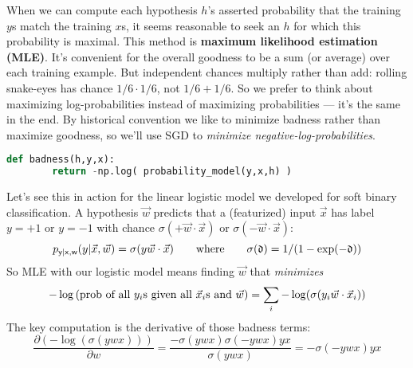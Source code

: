   When we can compute each hypothesis $h$'s asserted probability
  that the training $y$s match the training $x$s, it seems
  reasonable to seek an $h$ for which this probability is maximal.  This
  method is \textbf{maximum likelihood estimation (MLE)}.
  It's convenient for the overall goodness to be a sum (or average) over each
  training example.  But independent chances multiply rather than add:
  rolling snake-eyes has chance $1\!/\!6 \cdot 1\!/\!6$, not $1\!/\!6 + 1\!/\!6$.  So
  we prefer to think about maximizing log-probabilities instead of maximizing
  probabilities --- it's the same in the end.
  By historical
  convention we like to minimize badness rather than maximize goodness, so
  we'll use SGD to \emph{minimize negative-log-probabilities}.
  \begin{lstlisting}[language=Python, basicstyle=\footnotesize\ttfamily]
    def badness(h,y,x):
        return -np.log( probability_model(y,x,h) )
  \end{lstlisting}

  Let's see this in action for the linear logistic model we developed for soft
  binary classification.  A hypothesis $\vec w$ predicts that a (featurized)
  input $\vec x$ has label $y=+1$ or $y=-1$ with chance $\sigma(+ \vec w \cdot \vec x)$
  or $\sigma(- \vec w \cdot \vec x)$:
  $$
    p_{\mathsf{y}|\mathsf{x},\mathsf{w}}(y|\vec x,\vec w) = \sigma(y \vec w \cdot \vec x)
    \quad\quad
    \text{where}
    \quad\quad
    \sigma(\mathfrak{d}) = 1/(1-\exp(-\mathfrak{d}))
  $$
  So MLE with our logistic model means finding $\vec w$ that \emph{minimizes}
  $$
    -\log\left(\text{prob of all $y_i$s given all $\vec x_i$s and $\vec w$}\right)
    =
    \sum_i -\log(\sigma(y_i \vec w\cdot \vec x_i))
  $$
  The key computation is the derivative of those badness terms:
  $$
    \frac{\partial (-\log(\sigma(y w x)))}{\partial w}
    =
    \frac{-\sigma(y w x)\sigma(-y w x) y x}{\sigma(y w x)}
    =
    - \sigma(-y w x) y x
  $$



